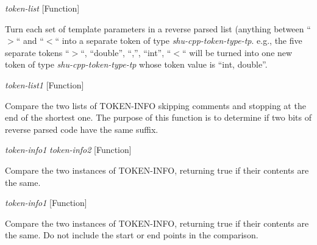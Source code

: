 \vspace{1em}
\noindent
{}
\usebox{\funcname}\emph{token-list}
 \hfill [Function]

\begin{doc-string}
Turn each set of template parameters in a reverse parsed list (anything between
``$>$`` and ``$<$`` into a separate token of type \emph{shu-cpp-token-type-tp}.  e.g., the
five separate tokens ``$>$``, ``double'', ``,'', ``int'', ``$<$`` will be turned into
one new token of type \emph{shu-cpp-token-type-tp} whose token value is ``int, double''.
\end{doc-string}

\vspace{1em}
\noindent
{}
\usebox{\funcname}\emph{token-list1}
 \hfill [Function]
\hspace*{\wd\funcname}

\begin{doc-string}
Compare the two lists of TOKEN-INFO skipping comments and stopping at the end
of the shortest one.  The purpose of this function is to determine if two bits
of reverse parsed code have the same suffix.
\end{doc-string}

\vspace{1em}
\noindent
{}
\usebox{\funcname}\emph{token-info1} \emph{token-info2}
 \hfill [Function]

\begin{doc-string}
Compare the two instances of TOKEN-INFO, returning true if their contents
are the same.
\end{doc-string}

\vspace{1em}
\noindent
{}
\usebox{\funcname}\emph{token-info1}
 \hfill [Function]
\hspace*{\wd\funcname}

\begin{doc-string}
Compare the two instances of TOKEN-INFO, returning true if their contents
are the same.  Do not include the start or end points in the comparison.
\end{doc-string}

